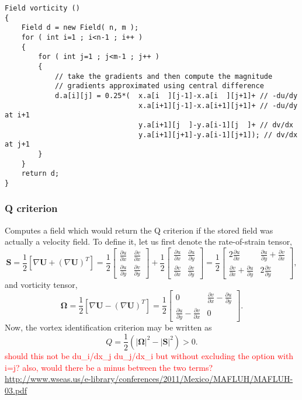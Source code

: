 \documentclass[notitlepage]{article}
\begin{document}
\begin{lstlisting}[style=myCpp]
Field vorticity ()
{
	Field d = new Field( n, m );
	for ( int i=1 ; i<n-1 ; i++ )
	{
		for ( int j=1 ; j<m-1 ; j++ )
		{
			// take the gradients and then compute the magnitude
			// gradients approximated using central difference
			d.a[i][j] = 0.25*(	x.a[i  ][j-1]-x.a[i  ][j+1]+ // -du/dy
								x.a[i+1][j-1]-x.a[i+1][j+1]+ // -du/dy at i+1
								y.a[i+1][j  ]-y.a[i-1][j  ]+ // dv/dx
								y.a[i+1][j+1]-y.a[i-1][j+1]); // dv/dx at j+1
		}
	}
	return d;
}
\end{lstlisting}

\subsubsection{Q criterion}

Computes a field which would return the Q criterion if the stored
field was actually a velocity field.
To define it, let us first denote the rate-of-strain tensor,
%
\begin{equation}
\mathbf{S} = \frac{1}{2}\left[\nabla\mathbf{U}+\left(\nabla\mathbf{U}\right)^T\right]
	= \frac{1}{2} \begin{bmatrix}
		\frac{\partial u}{\partial x} & \frac{\partial v}{\partial x} \\
		\frac{\partial u}{\partial y} & \frac{\partial v}{\partial y}
		\end{bmatrix}
	+ \frac{1}{2} \begin{bmatrix}
		\frac{\partial u}{\partial x} & \frac{\partial u}{\partial y} \\
		\frac{\partial v}{\partial x} & \frac{\partial v}{\partial y}
		\end{bmatrix}
	= \frac{1}{2} \begin{bmatrix}
		2\frac{\partial u}{\partial x} & \frac{\partial u}{\partial y} + \frac{\partial v}{\partial x} \\
		\frac{\partial v}{\partial x} + \frac{\partial u}{\partial y} & 2\frac{\partial v}{\partial y}
		\end{bmatrix} ,
\end{equation}
%
and vorticity tensor,
%
\begin{equation}
\mathbf{\Omega} = \frac{1}{2}\left[\nabla\mathbf{U}-\left(\nabla\mathbf{U}\right)^T\right]
	= \frac{1}{2} \begin{bmatrix}
		0 & \frac{\partial v}{\partial x} - \frac{\partial u}{\partial y} \\
		\frac{\partial u}{\partial y} - \frac{\partial v}{\partial x} & 0
		\end{bmatrix} .
\end{equation}
%
Now, the vortex identification criterion may be written as
%
\begin{equation}
Q = \frac{1}{2} \left(\left|\mathbf{\Omega}\right|^2
	- \left|\mathbf{S}\right|^2 \right) > 0.
\end{equation}
\textcolor{red}{should this not be du\_i/dx\_j du\_j/dx\_i but without
excluding the option with i=j? also, would there be a minus between the
two terms?}
\url{http://www.wseas.us/e-library/conferences/2011/Mexico/MAFLUH/MAFLUH-03.pdf}
\end{document}
